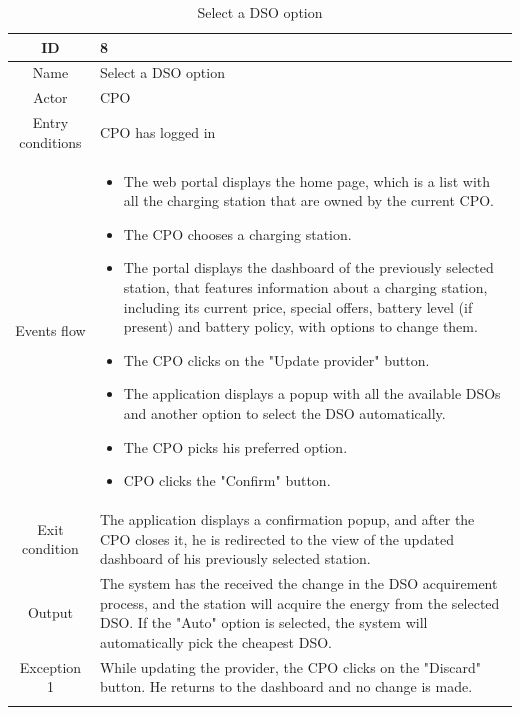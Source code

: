 \newpage
\begin{longtable}{|c| p{10cm}|}
    \hline ID        & 8\\
    \hline
    Name     & Select a DSO option \\
    \hline
    Actor            & CPO\\
    \hline
    Entry conditions & CPO has logged in \\
    \hline
    Events flow      & \begin{itemize}[nosep,after=\strut]
        \item The web portal displays the home page, which is a list with all the charging station that are owned by the current CPO.
        \item The CPO chooses a charging station.
        \item The portal displays the dashboard of the previously selected station, that features information about a charging station, including its current price, special offers, battery level (if present) and battery policy, with options to change them.
        \item The CPO clicks on the "Update provider" button.
        \item The application displays a popup with all the available DSOs and another option to select the DSO automatically.
        \item The CPO picks his preferred option.
        \item CPO clicks the "Confirm" button.
    \end{itemize}\\
    \hline
    Exit condition   & The application displays a confirmation popup, and after the CPO closes it, he is redirected to the view of the updated dashboard of his previously selected station.\\
    \hline
    Output           & The system has the received the change in the DSO acquirement process, and the station will acquire the energy from the selected DSO. If the "Auto" option is selected, the system will automatically pick the cheapest DSO.
    \\
    \hline
    \hline
    Exception 1      &  While updating the provider, the CPO clicks on the "Discard" button. He returns to the dashboard and no change is made. \\
    \hline
    \caption{Select a DSO option}\\
\end{longtable}
